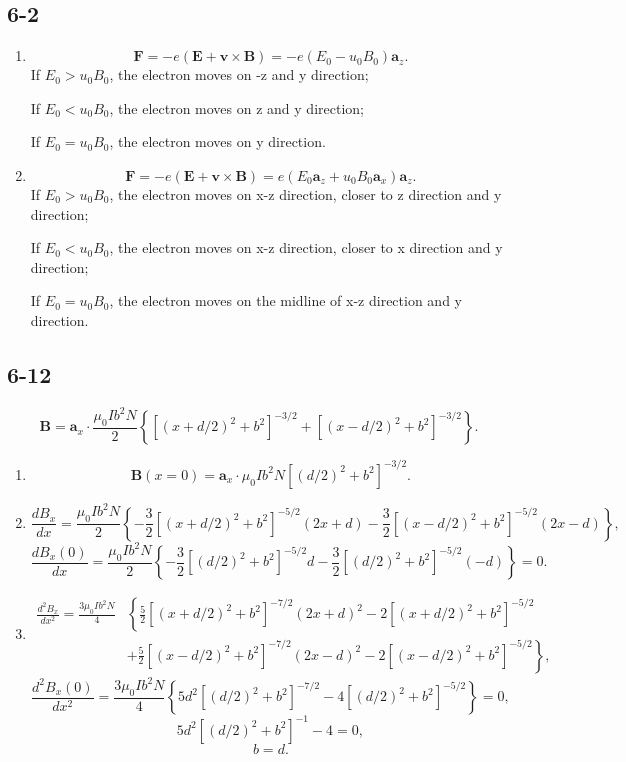 \documentclass[6pt,a4paper]{article}
\begin{document}
\subsection{6-2}
\begin{enumerate}[label=\alph*)]
\item
$$\mathbf{F}=-e(\mathbf{E}+\mathbf{v}\times\mathbf{B})=-e(E_0-u_0B_0)\mathbf{a}_z.$$
If $E_0>u_0B_0$, the electron moves on -z and y direction;

If $E_0<u_0B_0$, the electron moves on z and y direction;

If $E_0=u_0B_0$, the electron moves on y direction.
\item
$$\mathbf{F}=-e(\mathbf{E}+\mathbf{v}\times\mathbf{B})=e(E_0\mathbf{a}_z+u_0B_0\mathbf{a}_x)\mathbf{a}_z.$$
If $E_0>u_0B_0$, the electron moves on x-z direction, closer to z direction and y direction;

If $E_0<u_0B_0$, the electron moves on x-z direction, closer to x direction and y direction;

If $E_0=u_0B_0$, the electron moves on the midline of x-z direction and y direction.
\end{enumerate}

\subsection{6-12}
$$\mathbf{B}=\mathbf{a}_x\cdot\frac{\mu_0Ib^2N}{2}\left\{[(x+d/2)^2+b^2]^{-3/2}+[(x-d/2)^2+b^2]^{-3/2}\right\}.$$
\begin{enumerate}[label=\alph*)]
\item
$$\mathbf{B}(x=0)=\mathbf{a}_x\cdot\mu_0Ib^2N[(d/2)^2+b^2]^{-3/2}.$$
\item
$$\frac{dB_x}{dx}=\frac{\mu_0Ib^2N}{2}\left\{-\frac{3}{2}[(x+d/2)^2+b^2]^{-5/2}(2x+d)-\frac{3}{2}[(x-d/2)^2+b^2]^{-5/2}(2x-d)\right\},$$
$$\frac{dB_x(0)}{dx}=\frac{\mu_0Ib^2N}{2}\left\{-\frac{3}{2}[(d/2)^2+b^2]^{-5/2}d-\frac{3}{2}[(d/2)^2+b^2]^{-5/2}(-d)\right\}=0.$$
\item
\begin{align*}
\frac{d^2B_x}{dx^2}=\frac{3\mu_0Ib^2N}{4}&\left\{\frac{5}{2}[(x+d/2)^2+b^2]^{-7/2}(2x+d)^2-2[(x+d/2)^2+b^2]^{-5/2}\right.\\
&\left.+\frac{5}{2}[(x-d/2)^2+b^2]^{-7/2}(2x-d)^2-2[(x-d/2)^2+b^2]^{-5/2}\right\},
\end{align*}
$$\frac{d^2B_x(0)}{dx^2}=\frac{3\mu_0Ib^2N}{4}\left\{5d^2[(d/2)^2+b^2]^{-7/2}-4[(d/2)^2+b^2]^{-5/2}\right\}=0,$$
$$5d^2[(d/2)^2+b^2]^{-1}-4=0,$$
$$b=d.$$
\end{enumerate}
\end{document}
